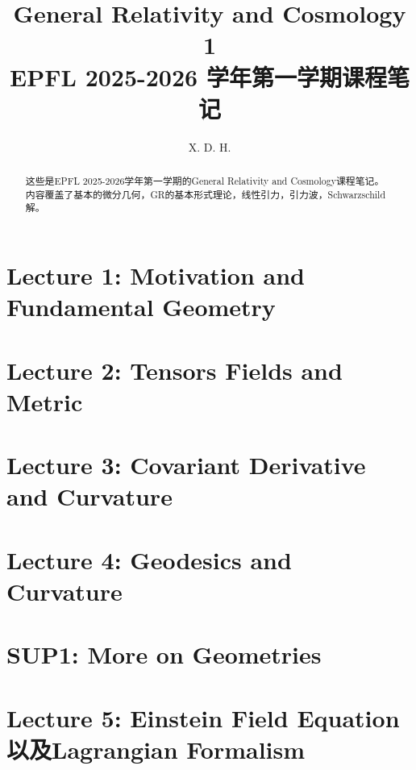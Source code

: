 \documentclass[10pt]{article}
\begin{document}
\title{\boldmath General Relativity and Cosmology 1 \\ \large EPFL 2025-2026 学年第一学期课程笔记}
\author{X. D. H.}

\maketitle

\begin{abstract}
这些是EPFL 2025-2026学年第一学期的General Relativity and Cosmology课程笔记。内容覆盖了基本的微分几何，GR的基本形式理论，线性引力，引力波，Schwarzschild解。
\end{abstract}

\tableofcontents

\newpage
\section{Lecture 1: Motivation and Fundamental Geometry}\label{sec:Lecture 1} %


\newpage
\section{Lecture 2: Tensors Fields and Metric}\label{sec:Lecture 2} %



\newpage
\section{Lecture 3: Covariant Derivative and Curvature}\label{sec:Lecture 3: Covariant Derivative and Curvature} %



\newpage
\section{Lecture 4: Geodesics and Curvature}\label{sec:Lecture 4: } %



\newpage
\section{SUP1: More on Geometries}\label{sec:SUP1: More on Geometries} %



\newpage
\section{Lecture 5: Einstein Field Equation以及Lagrangian Formalism}\label{sec:Lecture 5: } %

\end{document}
